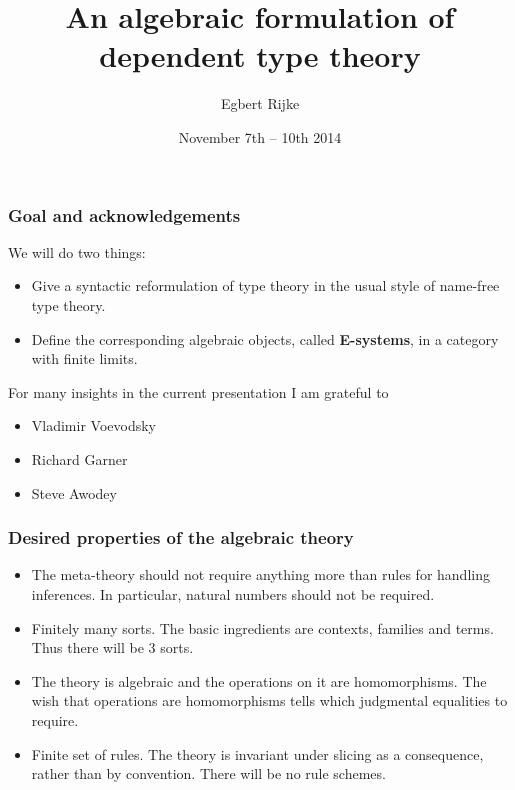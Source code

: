 \documentclass[handout]{beamer}
\title{\bf An algebraic formulation of dependent type theory}
\author{Egbert Rijke}
\institute{Carnegie Mellon University\\\texttt{erijke@andrew.cmu.edu}}
\date{November 7th -- 10th 2014}
\newcommand\important[1]{\textbf{\color{red!90!black}#1}}
\begin{document}
\begin{frame}
\titlepage
\end{frame}

\begin{frame}
\frametitle{\bf Goal and acknowledgements}
We will do two things:
\begin{itemize}
\item Give a syntactic reformulation of type theory in the usual style of
name-free type theory.
\item Define the corresponding algebraic objects, called \important{E-systems}, in a category with finite limits.
\end{itemize}
\pause
For many insights in the current presentation I am grateful to
\begin{itemize}
\item Vladimir Voevodsky
\item Richard Garner
\item Steve Awodey
\end{itemize}
\end{frame}

\begin{frame}
\frametitle{\bf Desired properties of the algebraic theory}
\begin{itemize}
\item The meta-theory should not require anything more than rules for handling
inferences. In particular, natural numbers should not be required.
\pause
\item Finitely many sorts. The basic ingredients are contexts, families and
terms. Thus there will be 3 sorts.
\pause
\item The theory is algebraic and the operations on it are homomorphisms. The
wish that operations are homomorphisms tells which judgmental equalities to
require.
\pause
\item Finite set of rules. The theory is invariant under slicing as a consequence, rather than by
convention. There will be no rule schemes.
\end{itemize}
\end{frame}
\end{document}

